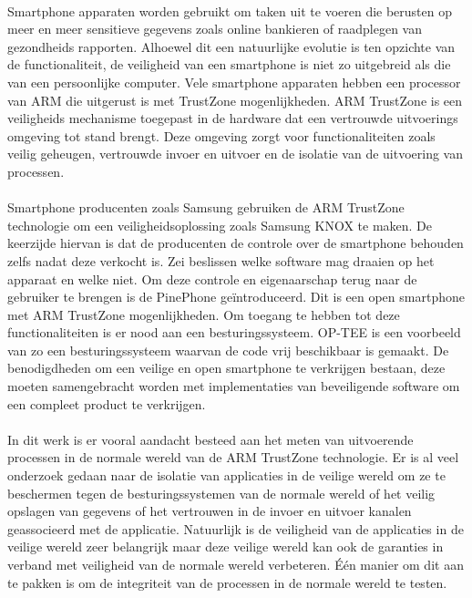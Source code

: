 \documentclass[master=cws,masteroption=vs,english]{kulemt}
\begin{document}
\begin{abstract*}

\paragraph*{}
Smartphone apparaten worden gebruikt om taken uit te voeren die berusten op meer en meer sensitieve gegevens zoals online bankieren of raadplegen van gezondheids rapporten. Alhoewel dit een natuurlijke evolutie is ten opzichte van de functionaliteit, de veiligheid van een smartphone is niet zo uitgebreid als die van een persoonlijke computer. Vele smartphone apparaten hebben een processor van ARM die uitgerust is met TrustZone mogenlijkheden. ARM TrustZone is een veiligheids mechanisme toegepast in de hardware dat een vertrouwde uitvoerings omgeving tot stand brengt. Deze omgeving zorgt voor functionaliteiten zoals veilig geheugen, vertrouwde invoer en uitvoer en de isolatie van de uitvoering van processen.

\paragraph*{}
Smartphone producenten zoals Samsung gebruiken de ARM TrustZone technologie om een veiligheidsoplossing zoals Samsung KNOX te maken. De keerzijde hiervan is dat de producenten de controle over de smartphone behouden zelfs nadat deze verkocht is. Zei beslissen welke software mag draaien op het apparaat en welke niet. Om deze controle en eigenaarschap terug naar de gebruiker te brengen is de PinePhone ge\"introduceerd. Dit is een open smartphone met ARM TrustZone mogenlijkheden. Om toegang te hebben tot deze functionaliteiten is er nood aan een besturingssysteem. OP-TEE is een voorbeeld van zo een besturingssysteem waarvan de code vrij beschikbaar is gemaakt. De benodigdheden om een veilige en open smartphone te verkrijgen bestaan, deze moeten samengebracht worden met implementaties van beveiligende software om een compleet product te verkrijgen.

\paragraph*{}
In dit werk is er vooral aandacht besteed aan het meten van uitvoerende processen in de normale wereld van de ARM TrustZone technologie. Er is al veel onderzoek gedaan naar de isolatie van applicaties in de veilige wereld om ze te beschermen tegen de besturingssystemen van de normale wereld of het veilig opslagen van gegevens of het vertrouwen in de invoer en uitvoer kanalen geassocieerd met de applicatie. Natuurlijk is de veiligheid van de applicaties in de veilige wereld zeer belangrijk maar deze veilige wereld kan ook de garanties in verband met veiligheid van de normale wereld verbeteren. \'E\'en manier om dit aan te pakken is om de integriteit van de processen in de normale wereld te testen. 

\end{abstract*}
\end{document}
